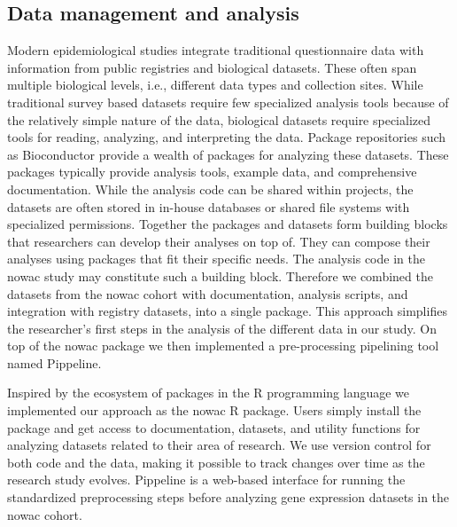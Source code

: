 \subsection{Data management and analysis} 
Modern epidemiological studies integrate traditional questionnaire data with
information from public registries and biological datasets. These often span
multiple biological levels, i.e., different data types and collection sites.
While traditional survey based datasets require few specialized analysis tools
because of the relatively simple nature of the data, biological datasets require
specialized tools for reading, analyzing, and interpreting the data. Package
repositories such as Bioconductor\cite{bioconductor} provide a wealth of
packages for analyzing these datasets. These packages typically provide analysis
tools, example data, and comprehensive documentation. While the analysis code
can be shared within projects, the datasets are often stored in in-house
databases or shared file systems with specialized permissions. Together the
packages and datasets form building blocks that researchers can develop their
analyses on top of. They can compose their analyses using packages that fit
their specific needs. The analysis code in the \gls{nowac} study may constitute
such a building block. Therefore we combined the datasets from the \gls{nowac}
cohort with documentation, analysis scripts, and integration with registry
datasets, into a single package.  This approach simplifies the researcher's
first steps in the analysis of the different data in our study. On top of the
\gls{nowac} package we then implemented a pre-processing pipelining tool named
Pippeline. 

Inspired by the ecosystem of packages in the R programming language we
implemented our approach as the \gls{nowac} R package. Users simply install the
package and get access to documentation, datasets, and utility functions for
analyzing datasets related to their area of research. We use version
control for both code and the data, making it possible to track changes over
time as the research study evolves. Pippeline is a web-based interface for
running the standardized preprocessing steps before analyzing gene expression
datasets in the \gls{nowac} cohort. 

